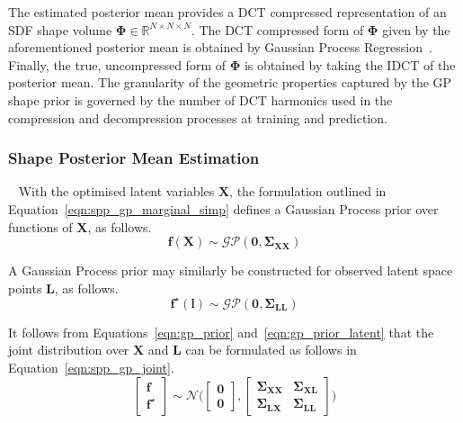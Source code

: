 The estimated posterior mean provides a DCT compressed representation of an SDF shape 
volume \( \bm{\Phi} \in \mathbb{R}^{N \times N \times N} \). The DCT compressed form 
of \( \bm{\Phi} \) given by the aforementioned posterior mean is obtained by Gaussian 
Process Regression~\cite{GPML}. Finally, the true, uncompressed form of \( \bm{\Phi} \) is 
obtained by taking the IDCT of the posterior mean. The granularity of the geometric 
properties captured by the GP shape prior is governed by the number of DCT harmonics 
used in the compression and decompression processes at training and prediction.

\subsubsection{Shape Posterior Mean Estimation}
~\label{subsubsec:spp_pos_mean_est}
With the optimised latent variables \( \bm{X} \), the formulation outlined in 
Equation~\ref{eqn:spp_gp_marginal_simp} defines a Gaussian Process prior 
over functions of \( \bm{X} \), as follows.
\begin{equation}
  \label{eqn:gp_prior}
  \bm{f}(\bm{X}) \sim \mathcal{GP}(\bm{0}, \bm{\Sigma}_{\bm{XX}})
\end{equation}

A Gaussian Process prior may similarly be constructed for observed latent 
space points \( \bm{L} \), as follows.
\begin{equation}
  \label{eqn:gp_prior_latent}
  \bm{f}^{\star}(\bm{l}) \sim \mathcal{GP}(\bm{0}, \bm{\Sigma}_{\bm{LL}})
\end{equation}

It follows from Equations~\ref{eqn:gp_prior} and~\ref{eqn:gp_prior_latent} that 
the joint distribution over \( \bm{X} \) and \( \bm{L} \) can be formulated as 
follows in Equation~\ref{eqn:spp_gp_joint}.
\begin{equation}
  \label{eqn:spp_gp_joint}
  \begin{bmatrix}
    \bm{f}\\
    \bm{f}^{\star}
  \end{bmatrix}
  \sim \mathcal{N} \Bigg(
    \begin{bmatrix}
      \bm{0}\\
      \bm{0}
    \end{bmatrix},
    \begin{bmatrix}
      \bm{\Sigma}_{\bm{XX}} & \bm{\Sigma}_{\bm{XL}}\\
      \bm{\Sigma}_{\bm{LX}} & \bm{\Sigma}_{\bm{LL}}
    \end{bmatrix}
  \Bigg)
\end{equation}


